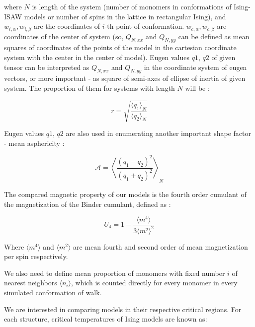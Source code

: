 \documentclass[a4paper]{jpconf}
\begin{document}
where $N$ is length of the system (number of monomers in conformations of Ising-ISAW models or number of spins in the lattice in rectangular Ising), and  $w_{i, \alpha},w_{i, \beta}$ are the coordinates of $i$-th point of conformation. $w_{c, \alpha},w_{c, \beta}$ are coordinates of the center of system (so, $Q_{N, xx}$ and $Q_{N,yy}$ can be defined as mean squares of coordinates of the points of the model in the cartesian coordinate system with the center in the center of model). Eugen values $q1$, $q2$ of given tensor can be interpreted as $Q_{N, xx}$ and $Q_{N,yy}$ in the coordinate system of eugen vectors, or more important - as square of semi-axes of ellipse of inertia of given system. The proportion of them for systems with length $N$ will be \cite{Caracciolo2011}: 

\begin{equation}
    r = \sqrt{\frac{\langle q_{1}\rangle_{N}}{\langle q_{2} \rangle_{N}}}
\end{equation}

Eugen values $q1$, $q2$ are also used in enumerating another important shape factor - mean asphericity \cite{Caracciolo2011}:

\begin{equation}
\label{eq:Asphericity}
    \mathcal{A} = \left\langle \frac{(q_{1} - q_{2})^{2}}{(q_{1} + q_{2})^{2}} \right\rangle_{N}
\end{equation}

The compared magnetic property of our models is the fourth order cumulant of the magnetization of the Binder cumulant, defined as \cite{Binder1981_Ising}:

\begin{equation}
\label{eq:Cumulant}
U_{4} = 1 - \frac{\langle m^{4} \rangle}{3 \langle m^{2} \rangle^{2}}
\end{equation}

Where $\langle m^{4} \rangle$ and $\langle m^{2} \rangle$ are mean fourth and second order of mean magnetization per spin respectively.

We also need to define mean proportion of monomers with fixed number $i$ of nearest neighbors $\langle n_{i} \rangle$, which is counted directly for every monomer in every simulated conformation of walk.

We are interested in comparing models in their respective critical regions. For each structure, critical temperatures of Ising models are known as:
\end{document}
